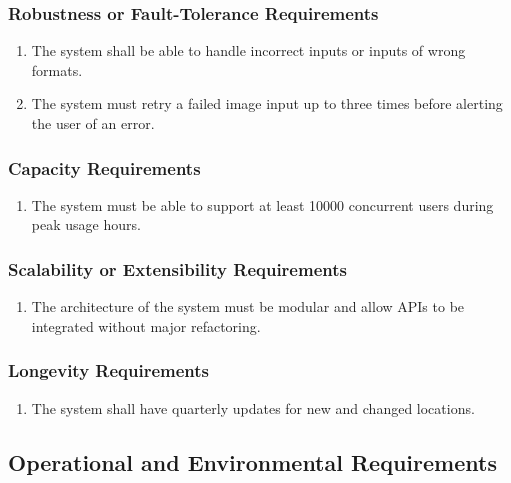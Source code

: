 \documentclass[]{article}
\begin{document}
\subsubsection{Robustness or Fault-Tolerance Requirements}
\label{ssub:robustness_or_fault_tolerance_requirements}
\begin{enumerate}[{PR-RFT}1. ]
	\item The system shall be able to handle incorrect inputs or inputs of wrong formats.
	\item The system must retry a failed image input up to three times before alerting the user of an error.
\end{enumerate}

\subsubsection{Capacity Requirements}
\label{ssub:capacity_requirements}
\begin{enumerate}[{PR-C}1. ]
	\item The system must be able to support at least 10000 concurrent users during peak usage hours.
\end{enumerate}

\subsubsection{Scalability or Extensibility Requirements}
\label{ssub:scalability_or_extensibility_requirements}
\begin{enumerate}[{PR-SE}1. ]
	\item The architecture of the system must be modular and allow APIs to be integrated without major refactoring.
\end{enumerate}

\subsubsection{Longevity Requirements}
\label{ssub:longevity_requirements}
\begin{enumerate}[{PR-L}1. ]
	\item The system shall have quarterly updates for new and changed locations.
\end{enumerate}


\subsection{Operational and Environmental Requirements}
\label{sub:operational_and_environmental_requirements}
\end{document}
